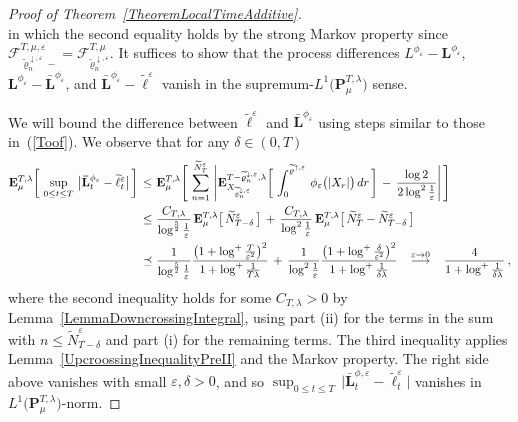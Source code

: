 \documentclass[10pt]{article}
\def\stackrel#1#2{\mathrel{\mathop{#2}\limits^{#1}}}
\numberwithin{equation}{section}
\theoremstyle{definition}
\begin{document}
\begin{proof}[Proof of Theorem~\ref{TheoremLocalTimeAdditive}]
$$    $$
in which the second equality holds by the strong Markov property since $ \mathscr{F}_{\widetilde{\varrho}_{n}^{\downarrow,\varepsilon}-  }^{T,\mu,\varepsilon}=\mathscr{F}_{\widetilde{\varrho}_{n}^{\downarrow,\varepsilon} }^{T,\mu}$.  It suffices to show that the process differences $ L^{\phi_\varepsilon} - \mathbf{L}^{\phi_\varepsilon} $,  $  \mathbf{L}^{\phi_\varepsilon}-\mathbf{\bar{L}}^{\phi_\varepsilon}   $, and $ \mathbf{\bar{L}}^{\phi_\varepsilon} - \widetilde{\ell}^{\varepsilon}  $ vanish in the supremum-$L^1\big(\mathbf{P}^{T,\lambda}_{\mu}\big)$ sense.

We will bound the difference between $\widetilde{\ell}^{\varepsilon}$ and $\mathbf{\bar{L}}^{\phi_\varepsilon}$ using steps similar to those in~(\ref{Toof}).
We observe that for any $\delta\in (0,T)$
\begin{align*}
\mathbf{E}^{T ,\lambda}_{\mu }\bigg[ \,\sup_{0\leq t\leq T}\,\big| \mathbf{\bar{L}}_t^{\phi_\varepsilon} -\widetilde{\ell}_t^{\varepsilon}   \big|\,\bigg]\,\leq \,&\,\mathbf{E}^{T ,\lambda}_{\mu }\Bigg[\,\sum_{n=1}^{ \widetilde{N}_{T}^{\varepsilon} }\,\Bigg| \mathbf{E}^{T-\widetilde{\varrho}_{n}^{\downarrow,\varepsilon}  ,\lambda}_{X_{\widetilde{\varrho}_{n}^{\downarrow,\varepsilon}} }\bigg[\, \int_{ 0}^{\widetilde{\varrho}^{\uparrow,\varepsilon} } \,     \phi_{\varepsilon}\big(|X_r|\big)\,dr \, \bigg]     \,-\,\frac{ \log 2 }{2\log^2 \frac{1}{\varepsilon  }   } \Bigg|\,\Bigg]  \nonumber  \\  \,\leq \,&\,\frac{  C_{T,\lambda}}{ \log^{\frac{5}{2}} \frac{1}{\varepsilon  }  }\,\mathbf{E}^{T ,\lambda}_{\mu }\big[\,\widetilde{N}_{T-\delta}^{\varepsilon}\, \big] \,+\, \frac{  C_{T,\lambda}}{ \log^{2} \frac{1}{\varepsilon  }  }\,\mathbf{E}^{T ,\lambda}_{\mu }\big[\,\widetilde{N}_{T}^{\varepsilon} -\widetilde{N}_{T-\delta}^{\varepsilon}\, \big]\nonumber 
 \\ \,\preceq \,&\,\frac{ 1 }{ \log^{\frac{5}{2}} \frac{1}{\varepsilon  }  }\frac{ \big(1+\log^+\frac{T}{\varepsilon^2}\big)^2 }{1+\log^+\frac{1}{T\lambda} }\,+\,\frac{ 1 }{ \log^{2} \frac{1}{\varepsilon  }  }\frac{ \big(1+\log^+\frac{\delta}{\varepsilon^2}\big)^2 }{1+\log^+\frac{1}{\delta\lambda} } \hspace{.3cm}\stackrel{\varepsilon\rightarrow 0}{\longrightarrow}\hspace{.3cm}\frac{ 4 }{1+\log^+\frac{1}{\delta\lambda} }  \,,
\end{align*}
where  the  second inequality holds for some $C_{T,\lambda}>0$ by Lemma~\ref{LemmaDowncrossingIntegral}, using part (ii) for the terms  in the sum with $n\leq \widetilde{N}_{T-\delta}^{\varepsilon} $ and part (i) for the remaining terms.  The third inequality applies Lemma~\ref{UpcroossingInequalityPreII} and the Markov property.  The right side above vanishes with small $\varepsilon,\delta>0$, and so  $ \sup_{0\leq t\leq T}\,\big| \mathbf{\bar{L}}_t^{\phi,\varepsilon} -\widetilde{\ell}_t^{\varepsilon}   \big|$ vanishes in $L^1\big(\mathbf{P}^{T,\lambda}_{\mu}\big)$-norm.


\end{proof}
\end{document}
